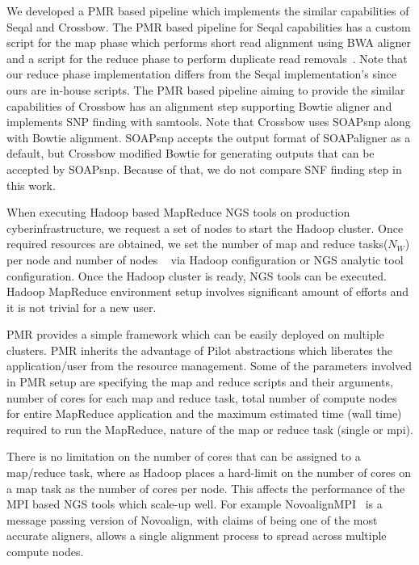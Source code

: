 \documentclass{acm_proc_article-sp}
\begin{document}
We developed a PMR based pipeline which implements the similar capabilities of Seqal
and Crossbow.  The PMR based pipeline for Seqal capabilities has a
custom script for the map phase which performs short read alignment using BWA
aligner and a script for the reduce phase to perform duplicate read removals~\cite{seal_2011_mapred}.  Note that our reduce
phase implementation differs from the Seqal implementation's since ours are in-house scripts.  The PMR based pipeline aiming to provide the similar capabilities of Crossbow has an alignment step supporting Bowtie aligner and implements SNP finding with samtools.  Note that Crossbow uses SOAPsnp along with Bowtie alignment.   SOAPsnp accepts the output format of SOAPaligner as a default, but Crossbow modified Bowtie for generating outputs that can be accepted by SOAPsnp.  Because of that, we do not compare SNF finding step in this work.
 
When executing Hadoop based MapReduce NGS tools on production
cyberinfrastructure, we request a set of nodes to start the Hadoop
cluster. Once required resources are obtained, we set the number of
map and reduce tasks($N_{W}$) per node and number of nodes
~  via Hadoop
configuration or NGS analytic tool configuration.  Once the Hadoop
cluster is ready, NGS tools can be executed. Hadoop MapReduce
environment setup involves significant amount of efforts and it is not
trivial for a new user.

PMR provides a simple framework which can be easily deployed on
multiple clusters. PMR inherits the advantage of Pilot abstractions
which liberates the application/user from the resource
management. Some of the parameters involved in PMR setup are
specifying the map and reduce scripts and their arguments, number of
cores for each map and reduce task, total number of compute nodes for
entire MapReduce application and the maximum estimated time (wall
time) required to run the MapReduce, nature of the map or reduce task
(single or mpi).

There is no limitation on the number of cores that can be assigned to
a map/reduce task, where as Hadoop places a hard-limit on the number
of cores on a map task as the number of cores per node.   This affects
the performance of the MPI based NGS tools which scale-up well. For
example NovoalignMPI~\cite{novo-align} is a message passing version of
Novoalign, with claims of being one of the most accurate aligners,
allows a single alignment process to spread across multiple compute
nodes.
\end{document}
